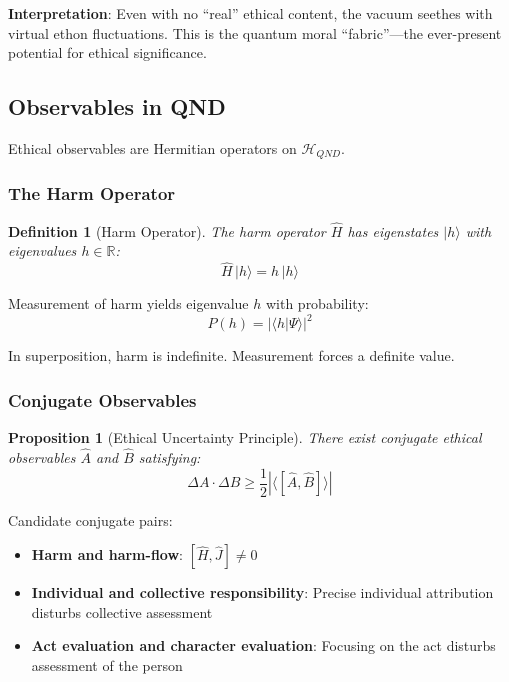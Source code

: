 \documentclass[12pt]{article}
\newtheorem{definition}{Definition}[section]
\newtheorem{proposition}{Proposition}[section]
\begin{document}
\textbf{Interpretation}: Even with no ``real'' ethical content, the vacuum seethes with virtual ethon fluctuations. This is the quantum moral ``fabric''---the ever-present potential for ethical significance.

\subsection{Observables in QND}

Ethical observables are Hermitian operators on $\mathcal{H}_{QND}$.

\subsubsection{The Harm Operator}

\begin{definition}[Harm Operator]
The harm operator $\hat{H}$ has eigenstates $|h\rangle$ with eigenvalues $h \in \mathbb{R}$:
\begin{equation}
    \hat{H} \,|h\rangle = h \,|h\rangle
\end{equation}
\end{definition}

Measurement of harm yields eigenvalue $h$ with probability:
\begin{equation}
    P(h) = |\langle h | \Psi \rangle|^2
\end{equation}

In superposition, harm is indefinite. Measurement forces a definite value.

\subsubsection{Conjugate Observables}

\begin{proposition}[Ethical Uncertainty Principle]
\emph{There exist conjugate ethical observables $\hat{A}$ and $\hat{B}$ satisfying:}
\begin{equation}
    \Delta A \cdot \Delta B \geq \frac{1}{2} |\langle [\hat{A}, \hat{B}] \rangle|
\end{equation}
\end{proposition}

Candidate conjugate pairs:
\begin{itemize}
    \item \textbf{Harm and harm-flow}: $[\hat{H}, \hat{J}] \neq 0$
    \item \textbf{Individual and collective responsibility}: Precise individual attribution disturbs collective assessment
    \item \textbf{Act evaluation and character evaluation}: Focusing on the act disturbs assessment of the person
\end{itemize}
\end{document}
